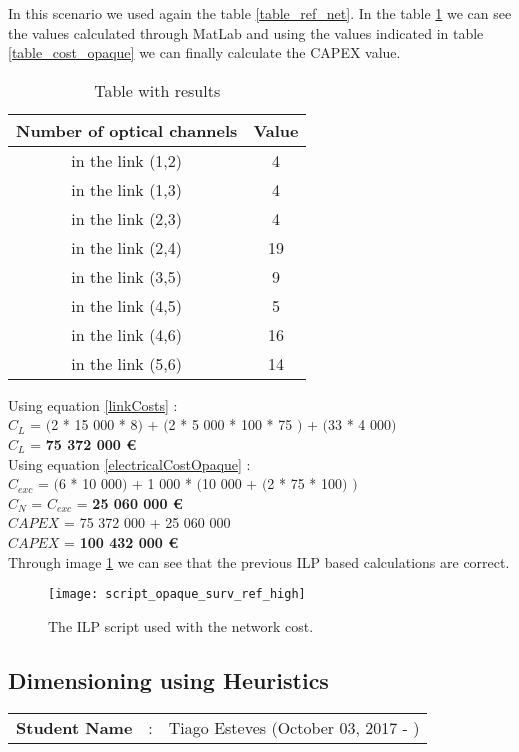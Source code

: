 In this scenario we used again the table \ref{table_ref_net}. In the table \ref{result_ILP2_reference} we can see the values calculated through MatLab and using the values indicated in table \ref{table_cost_opaque} we can finally calculate the CAPEX value.
\begin{table}[h!]
\centering
\begin{tabular}{|| c | c||}
 \hline
 Number of optical channels & Value \\
 \hline\hline
 in the link (1,2) & 4 \\
 in the link (1,3) & 4 \\
 in the link (2,3) & 4 \\
 in the link (2,4) & 19 \\
 in the link (3,5) & 9 \\
 in the link (4,5) & 5 \\
 in the link (4,6) & 16 \\
 in the link (5,6) & 14 \\
 \hline
\end{tabular}
\caption{Table with results}
\label{result_ILP2_reference}
\end{table}

Using equation \ref{linkCosts} : \\
$C_L$ = $($2 * 15 000 * 8$)$ + $($2 * 5 000 * 100 * 75 $)$ + $($33 * 4 000$)$ \\
$C_L$ = \textbf{ 75 372 000 \euro} \\

Using equation \ref{electricalCostOpaque} : \\
$C_{exc}$ = $($6 * 10 000$)$ + 1 000 * $($10 000 + $($2 * 75 * 100$)$ $)$ \\
$C_N$ = $C_{exc}$ = \textbf{25 060 000 \euro} \\

$CAPEX$ = 75 372 000 + 25 060 000 \\
$CAPEX$ = \textbf{100 432 000 \euro}\\

Through image \ref{scriptopaque_surv_ref_high} we can see that the previous ILP based calculations are correct.
\begin{figure}[h!]
\centering
\texttt{[image: script\_opaque\_surv\_ref\_high]}
\caption{The ILP script used with the network cost.}
\label{scriptopaque_surv_ref_high}
\end{figure}


\subsection{Dimensioning using Heuristics}
\begin{tcolorbox}	
\begin{tabular}{p{2.75cm} p{0.2cm} p{10.5cm}} 	
\textbf{Student Name}  &:& Tiago Esteves    (October 03, 2017 - )\\
\end{tabular}
\end{tcolorbox}

